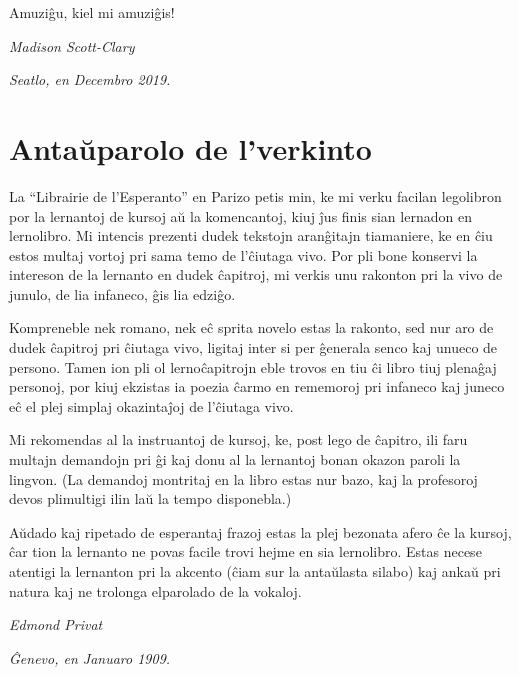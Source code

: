 \vspace{1em}

Amuziĝu, kiel mi amuziĝis!

\vspace{1em}

\noindent\emph{Madison Scott-Clary}

\noindent\emph{Seatlo, en Decembro 2019.}

\newpage

\section*{Antaŭparolo de l'verkinto}

La ``Librairie de l'Esperanto'' en Parizo petis min, ke mi verku facilan legolibron por la lernantoj de kursoj aŭ la komencantoj, kiuj ĵus finis sian lernadon en lernolibro. Mi intencis prezenti dudek tekstojn aranĝitajn tiamaniere, ke en ĉiu estos multaj vortoj pri sama temo de l'ĉiutaga vivo. Por pli bone konservi la intereson de la lernanto en dudek ĉapitroj, mi verkis unu rakonton pri la vivo de junulo, de lia infaneco, ĝis lia edziĝo.

Kompreneble nek romano, nek eĉ sprita novelo estas la rakonto, sed nur aro de dudek ĉapitroj pri ĉiutaga vivo, ligitaj inter si per ĝenerala senco kaj unueco de persono. Tamen ion pli ol lernoĉapitrojn eble trovos en tiu ĉi libro tiuj plenaĝaj personoj, por kiuj ekzistas ia poezia ĉarmo en rememoroj pri infaneco kaj juneco eĉ el plej simplaj okazintaĵoj de l'ĉiutaga vivo.

Mi rekomendas al la instruantoj de kursoj, ke, post lego de ĉapitro, ili faru multajn demandojn pri ĝi kaj donu al la lernantoj bonan okazon paroli la lingvon. (La demandoj montritaj en la libro estas nur bazo, kaj la profesoroj devos plimultigi ilin laŭ la tempo disponebla.)

Aŭdado kaj ripetado de esperantaj frazoj estas la plej bezonata afero ĉe la kursoj, ĉar tion la lernanto ne povas facile trovi hejme en sia lernolibro. Estas necese atentigi la lernanton pri la akcento (ĉiam sur la antaŭlasta silabo) kaj ankaŭ pri natura kaj ne trolonga elparolado de la vokaloj.

\vspace{1em}

\noindent\emph{Edmond Privat}

\noindent\emph{Ĝenevo, en Januaro 1909.}
